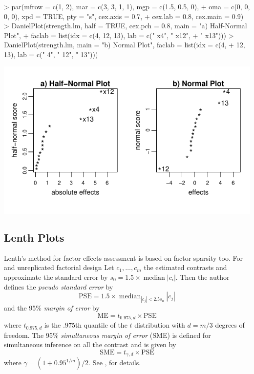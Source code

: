 \documentclass[letterpaper]{article}
\begin{document}
\begin{center}
\begin{Schunk}
\begin{Sinput}
> par(mfrow = c(1, 2), mar = c(3, 3, 1, 1), mgp = c(1.5, 0.5, 0), 
+     oma = c(0, 0, 0, 0), xpd = TRUE, pty = "s", cex.axis = 0.7, 
+     cex.lab = 0.8, cex.main = 0.9)
> DanielPlot(strength.lm, half = TRUE, cex.pch = 0.8, main = "a) Half-Normal Plot", 
+     faclab = list(idx = c(4, 12, 13), lab = c(" x4", " x12", 
+         " x13")))
> DanielPlot(strength.lm, main = "b) Normal Plot", faclab = list(idx = c(4, 
+     12, 13), lab = c(" 4", " 12", " 13")))
\end{Sinput}
\end{Schunk}
\includegraphics{BsMD-004}
\end{center}

\subsection{Lenth Plots}

Lenth's method for factor effects assessment is based on factor sparsity too.
For and unreplicated factorial design Let $c_1,\dots,c_m$ the estimated
contrasts and approximate the standard error by \( s_0 = 1.5 \times
\mathop{\text{median}} |c_i| \). Then the author defines the \emph{pseudo
standard error} by
\[ \text{PSE}=1.5 \times \mathop{\text{median}}_{|c_j|<2.5s_0} |c_j| \]
and the 95\% \emph{margin of error} by
\[ \text{ME}=t_{0.975,d} \times \text{PSE} \]
where $t_{0.975,d}$ is the .975th quantile of the $t$ distribution with
$d=m/3$ degrees of freedom. The 95\% \emph{simultaneous margin of error}
(SME) is defined for simultaneous inference on all the contrast and is given
by
\[\text{SME} = t_{\gamma,d} \times \text{PSE} \]
where $\gamma=(1+0.95^{1/m})/2$.  See \citet{Lenth-1989}, for details.
\end{document}
